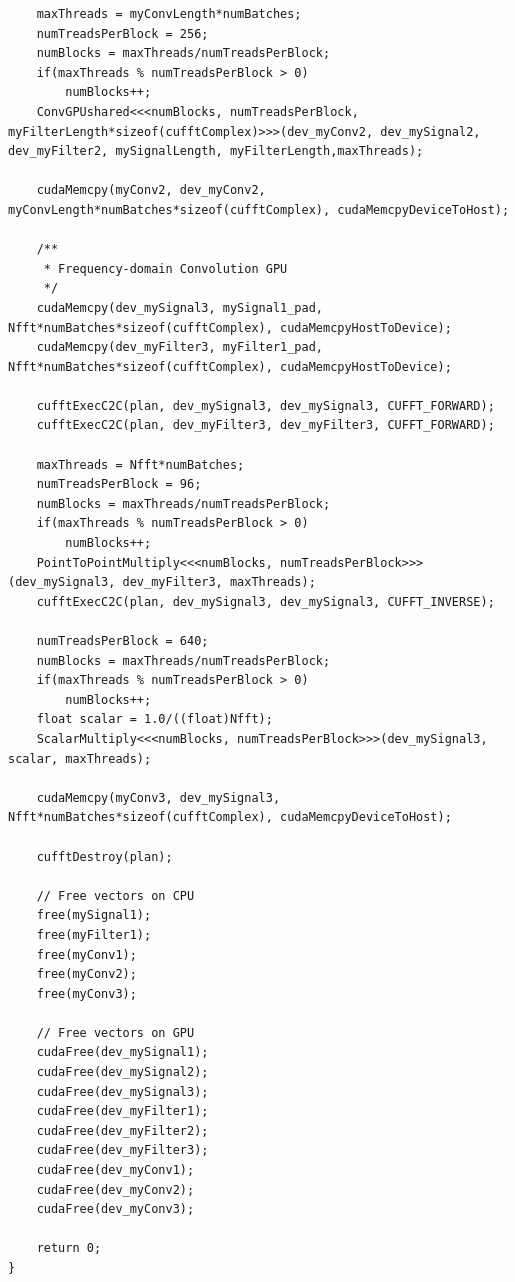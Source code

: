 \begin{lstlisting}
	maxThreads = myConvLength*numBatches;
	numTreadsPerBlock = 256;
	numBlocks = maxThreads/numTreadsPerBlock;
	if(maxThreads % numTreadsPerBlock > 0)
		numBlocks++;
	ConvGPUshared<<<numBlocks, numTreadsPerBlock, myFilterLength*sizeof(cufftComplex)>>>(dev_myConv2, dev_mySignal2, dev_myFilter2, mySignalLength, myFilterLength,maxThreads);

	cudaMemcpy(myConv2, dev_myConv2, myConvLength*numBatches*sizeof(cufftComplex), cudaMemcpyDeviceToHost);

	/**
	 * Frequency-domain Convolution GPU
	 */
	cudaMemcpy(dev_mySignal3, mySignal1_pad, Nfft*numBatches*sizeof(cufftComplex), cudaMemcpyHostToDevice);
	cudaMemcpy(dev_myFilter3, myFilter1_pad, Nfft*numBatches*sizeof(cufftComplex), cudaMemcpyHostToDevice);

	cufftExecC2C(plan, dev_mySignal3, dev_mySignal3, CUFFT_FORWARD);
	cufftExecC2C(plan, dev_myFilter3, dev_myFilter3, CUFFT_FORWARD);

	maxThreads = Nfft*numBatches;
	numTreadsPerBlock = 96;
	numBlocks = maxThreads/numTreadsPerBlock;
	if(maxThreads % numTreadsPerBlock > 0)
		numBlocks++;
	PointToPointMultiply<<<numBlocks, numTreadsPerBlock>>>(dev_mySignal3, dev_myFilter3, maxThreads);
	cufftExecC2C(plan, dev_mySignal3, dev_mySignal3, CUFFT_INVERSE);

	numTreadsPerBlock = 640;
	numBlocks = maxThreads/numTreadsPerBlock;
	if(maxThreads % numTreadsPerBlock > 0)
		numBlocks++;
	float scalar = 1.0/((float)Nfft);
	ScalarMultiply<<<numBlocks, numTreadsPerBlock>>>(dev_mySignal3, scalar, maxThreads);

	cudaMemcpy(myConv3, dev_mySignal3, Nfft*numBatches*sizeof(cufftComplex), cudaMemcpyDeviceToHost);

	cufftDestroy(plan);

	// Free vectors on CPU
	free(mySignal1);
	free(myFilter1);
	free(myConv1);
	free(myConv2);
	free(myConv3);

	// Free vectors on GPU
	cudaFree(dev_mySignal1);
	cudaFree(dev_mySignal2);
	cudaFree(dev_mySignal3);
	cudaFree(dev_myFilter1);
	cudaFree(dev_myFilter2);
	cudaFree(dev_myFilter3);
	cudaFree(dev_myConv1);
	cudaFree(dev_myConv2);
	cudaFree(dev_myConv3);

	return 0;
}
\end{lstlisting}
\doublespacing